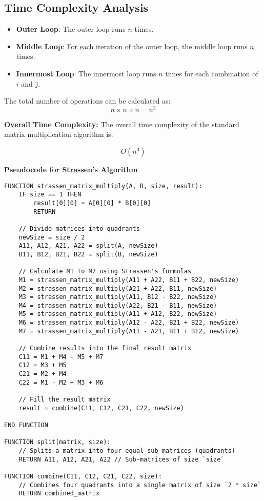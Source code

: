 \documentclass[a4paper,12pt]{report}
\begin{document}
\subsection*{Time Complexity Analysis}
\begin{itemize}
    \item \textbf{Outer Loop}: The outer loop runs \( n \) times.
    \item \textbf{Middle Loop}: For each iteration of the outer loop, the middle loop runs \( n \) times.
    \item \textbf{Innermost Loop}: The innermost loop runs \( n \) times for each combination of \( i \) and \( j \).
\end{itemize}

The total number of operations can be calculated as:
\[
n \times n \times n = n^3
\]

\textbf{Overall Time Complexity:} 
The overall time complexity of the standard matrix multiplication algorithm is:
\begin{tcolorbox}[colback=white, colframe=black, boxrule=0.5pt] %
\[
O(n^3)
\]
\end{tcolorbox}

\newpage
\textbf{Pseudocode for Strassen’s Algorithm}
\begin{tcolorbox}[colback=white, colframe=black, boxrule=0.5pt]
\ttfamily\small
\begin{verbatim}
FUNCTION strassen_matrix_multiply(A, B, size, result):
    IF size == 1 THEN
        result[0][0] = A[0][0] * B[0][0]
        RETURN

    // Divide matrices into quadrants
    newSize = size / 2
    A11, A12, A21, A22 = split(A, newSize)
    B11, B12, B21, B22 = split(B, newSize)

    // Calculate M1 to M7 using Strassen's formulas
    M1 = strassen_matrix_multiply(A11 + A22, B11 + B22, newSize)
    M2 = strassen_matrix_multiply(A21 + A22, B11, newSize)
    M3 = strassen_matrix_multiply(A11, B12 - B22, newSize)
    M4 = strassen_matrix_multiply(A22, B21 - B11, newSize)
    M5 = strassen_matrix_multiply(A11 + A12, B22, newSize)
    M6 = strassen_matrix_multiply(A12 - A22, B21 + B22, newSize)
    M7 = strassen_matrix_multiply(A11 - A21, B11 + B12, newSize)

    // Combine results into the final result matrix
    C11 = M1 + M4 - M5 + M7
    C12 = M3 + M5
    C21 = M2 + M4
    C22 = M1 - M2 + M3 + M6

    // Fill the result matrix
    result = combine(C11, C12, C21, C22, newSize)

END FUNCTION

FUNCTION split(matrix, size):
    // Splits a matrix into four equal sub-matrices (quadrants)
    RETURN A11, A12, A21, A22 // Sub-matrices of size `size`

FUNCTION combine(C11, C12, C21, C22, size):
    // Combines four quadrants into a single matrix of size `2 * size`
    RETURN combined_matrix
\end{verbatim}
\end{tcolorbox}
\end{document}
